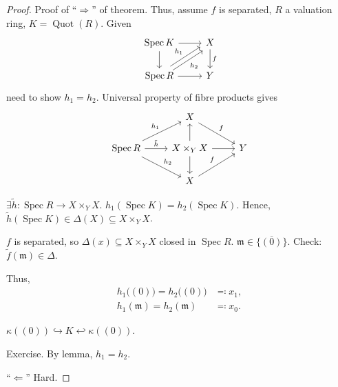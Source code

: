 \documentclass[12pt]{article}
\DeclareMathOperator{\Spec}{Spec}
\DeclareMathOperator{\Quot}{Quot}
\theoremstyle{definition}
\begin{document}
\begin{proof}
Proof of ``$\Rightarrow$'' of theorem. Thus, assume $f$ is separated, $R$ a valuation ring, $K=\Quot(R)$. Given
\[
\begin{tikzcd}
\Spec K\arrow[r]\arrow[d]&X\arrow[d,"f"]\\
\Spec R\arrow[r]\arrow[ru,shift left,"h_1"]\arrow[ru,shift right,"h_2",swap]&Y
\end{tikzcd}
\]
need to show $h_1=h_2$. Universal property of fibre products gives
\[
\begin{tikzcd}
&X\arrow[rd,"f"]\\
\Spec R\arrow[ru,"h_1"]\arrow[r,"\tilde{h}"]\arrow[rd,"h_2"]&X\times_YX\arrow[r]\arrow[u]\arrow[d]&Y\\
&X\arrow[ru,"f"]
\end{tikzcd}
\]

$\exists\tilde{h}:\Spec R\rightarrow X\times_YX$. $h_1(\Spec K)=h_2(\Spec K)$. Hence, $\tilde{h}(\Spec K)\in\Delta(X)\subseteq X\times_YX$.

$f$ is separated, so $\Delta(x)\subseteq X\times_YX$ closed in $\Spec R$. $\mathfrak{m}\in\overline{\{(0)\}}$. Check: $\tilde{f}(\mathfrak{m})\in\Delta$.

Thus,
\begin{align*}
h_1\big((0)\big)=h_2\big((0)\big)&\eqqcolon x_1,\\
h_1(\mathfrak{m})=h_2(\mathfrak{m})&\eqqcolon x_0.
\end{align*}

$\kappa((0))\hookrightarrow K\hookleftarrow\kappa((0))$.

Exercise. By lemma, $h_1=h_2$.

``$\Leftarrow$'' Hard.
\end{proof}
\end{document}
